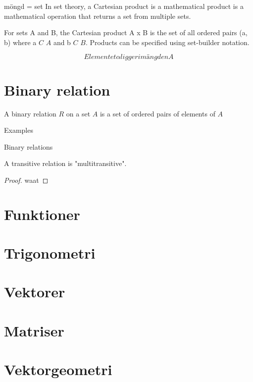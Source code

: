 \documentclass{article}
\begin{document}
\begin{definition}
möngd = set
In set theory, a Cartesian product is a mathematical product is a mathematical operation
that returns a set from multiple sets.

For sets A and B, the Cartesian product A x B is the set of all ordered pairs (a, b) where
a $C$ $A$ and b $C$ $B$.
Products can be specified using set-builder notation.




\begin{equation}
  Elementet  \alpha  ligger i mängden A
\end{equation}

\section{Binary relation}


\begin{definition}
A binary relation $R$ on a set $A$ is a set of ordered pairs of elements of $A$

Examples


\end{definition}

Binary relations

\begin{theorem}
  A transitive relation is "multitransitive".
\end{theorem}

\begin{proof}
  waat
\end{proof}

\section{Funktioner}

\section{Trigonometri}

\section{Vektorer}

\section{Matriser}

\section{Vektorgeometri}


\end{definition}
\end{document}
